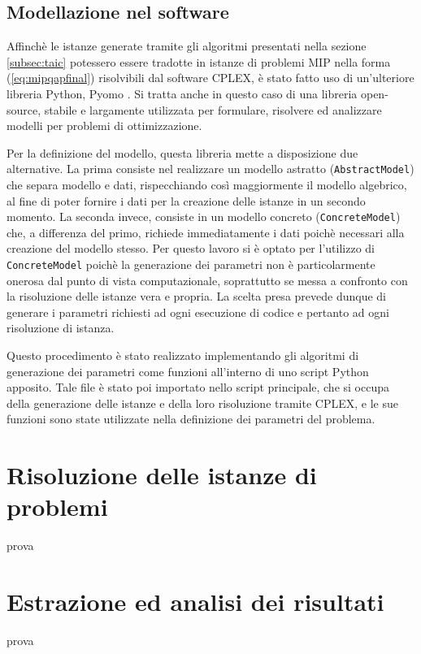 \subsection{Modellazione nel software}
Affinchè le istanze generate tramite gli algoritmi presentati nella sezione \ref{subsec:taic} potessero essere tradotte in istanze di 
problemi MIP nella forma (\ref{eq:mipqapfinal}) risolvibili dal software CPLEX, è stato fatto uso di un'ulteriore libreria Python, 
Pyomo \cite{bynum2021pyomo}\cite{hart2011pyomo}. Si tratta anche in questo caso di una libreria open-source, stabile e largamente utilizzata 
per formulare, risolvere ed analizzare modelli per problemi di ottimizzazione.

Per la definizione del modello, questa libreria mette a disposizione due alternative. La prima consiste nel realizzare un modello astratto 
(\texttt{AbstractModel}) che separa modello e dati, rispecchiando così maggiormente il modello algebrico, al fine di poter fornire i dati 
per la creazione delle istanze in un secondo momento. La seconda invece, consiste in un modello concreto (\texttt{ConcreteModel}) che, a differenza del primo, 
richiede immediatamente i dati poichè necessari alla creazione del modello stesso. Per questo lavoro si è optato per l'utilizzo di \texttt{ConcreteModel} poichè la generazione dei parametri 
non è particolarmente onerosa dal punto di vista computazionale, soprattutto se messa a confronto con la risoluzione delle istanze vera e 
propria. La scelta presa prevede dunque di generare i parametri richiesti ad ogni esecuzione di codice e pertanto ad ogni risoluzione di istanza. 

Questo procedimento è stato realizzato implementando gli algoritmi di generazione dei parametri come funzioni all'interno di uno script 
Python apposito. Tale file è stato poi importato nello script principale, che si occupa della generazione delle istanze e della loro risoluzione 
tramite CPLEX, e le sue funzioni sono state utilizzate nella definizione dei parametri del problema.




\section{Risoluzione delle istanze di problemi}
prova





\section{Estrazione ed analisi dei risultati}
prova